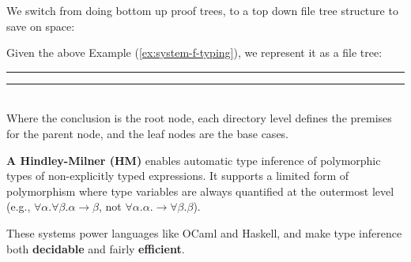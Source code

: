 \noindent
\DTsetlength{.2em}{1.5em}{.2em}{0.4pt}{0pt}

\noindent
We switch from doing bottom up proof trees, to a top down file tree structure to save on space:
\begin{Def}

    Given the above Example (\ref{ex:system-f-typing}), we represent it as a file tree:

    \noindent
    \rule{\textwidth}{0.4pt}
    \vspace{1em}
    \LARGE
    \normalsize

    \vspace{1em}
    \noindent
    \rule{\textwidth}{0.4pt}\\


    \noindent
    Where the conclusion is the root node, each directory level defines the premises 
    for the parent node, and the leaf nodes are the base cases.
\end{Def}
    
\noindent

\begin{Def}

    \textbf{A Hindley-Milner (HM)} enables automatic type inference of polymorphic types of non-explicitly typed expressions.
    It supports a limited form of polymorphism where type variables are always quantified at the outermost level (e.g., $\forall \alpha.\forall \beta.\alpha \to \beta$, not $\forall \alpha.\alpha.\to \forall \beta.\beta$).
    
    These systems power languages like OCaml and Haskell, and make type inference both \textbf{decidable} and fairly \textbf{efficient}.
    \end{Def}

